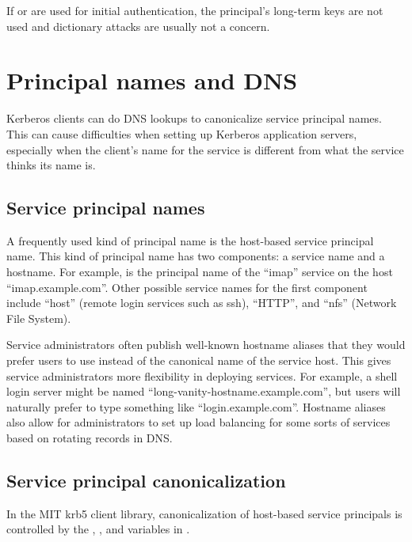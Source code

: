 \documentclass[letterpaper,10pt,english]{sphinxmanual}
\begin{document}
If {\hyperref[\detokenize{admin/pkinit:pkinit}]{}} or {\hyperref[\detokenize{admin/otp:otp-preauth}]{}} are used for
initial authentication, the principal’s long-term keys are not used
and dictionary attacks are usually not a concern.


\chapter{Principal names and DNS}
\label{\detokenize{admin/princ_dns:principal-names-and-dns}}\label{\detokenize{admin/princ_dns::doc}}
Kerberos clients can do DNS lookups to canonicalize service principal
names.  This can cause difficulties when setting up Kerberos
application servers, especially when the client’s name for the service
is different from what the service thinks its name is.


\section{Service principal names}
\label{\detokenize{admin/princ_dns:service-principal-names}}
A frequently used kind of principal name is the host-based service
principal name.  This kind of principal name has two components: a
service name and a hostname.  For example, 
is the principal name of the “imap” service on the host
“imap.example.com”.  Other possible service names for the first
component include “host” (remote login services such as ssh), “HTTP”,
and “nfs” (Network File System).

Service administrators often publish well-known hostname aliases that
they would prefer users to use instead of the canonical name of the
service host.  This gives service administrators more flexibility in
deploying services.  For example, a shell login server might be named
“long-vanity-hostname.example.com”, but users will naturally prefer to
type something like “login.example.com”.  Hostname aliases also allow
for administrators to set up load balancing for some sorts of services
based on rotating  records in DNS.


\section{Service principal canonicalization}
\label{\detokenize{admin/princ_dns:service-principal-canonicalization}}
In the MIT krb5 client library, canonicalization of host-based service
principals is controlled by the ,
, and  variables in {\hyperref[\detokenize{admin/conf_files/krb5_conf:libdefaults}]{}}.
\end{document}
